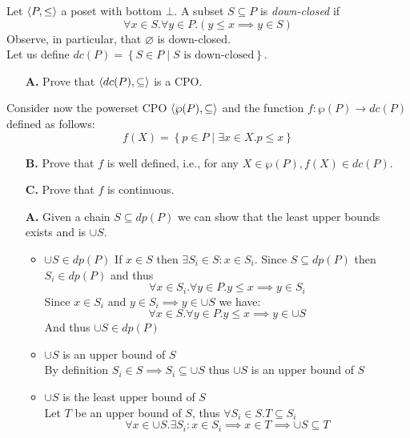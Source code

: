 \begin{exercise}{
    Let $\left< P, \leq \right>$ a poset with bottom $\bot$. A subset $S \subseteq P$ is \textit{down-closed} if
    \[ \forall x \in S. \forall y \in P. (y \leq x \implies y \in S) \]
    Observe, in particular, that $\varnothing$ is down-closed. \\
    Let us define $dc(P) = \left\{S \in P \mid S \text{ is down-closed}\right\}$.
    \begin{enumerate}
        \item[\textbf{A.}] Prove that $\left< dc(P), \subseteq \right>$ is a CPO.
    \end{enumerate}
    Consider now the powerset CPO $\left< \wp(P), \subseteq \right>$ and the function $f : \wp(P) \to dc(P)$ defined as follows:
    \[ f(X) = \left\{ p \in P \mid \exists x \in X . p \leq x \right\} \]
    \begin{enumerate}
        \item[\textbf{B.}] Prove that $f$ is well defined, i.e., for any $X \in \wp(P), f(X) \in dc(P)$.
        \item[\textbf{C.}] Prove that $f$ is continuous.
    \end{enumerate}
}
    \begin{enumerate}
        \item[\textbf{A.}]
            Given a chain $S \subseteq dp(P)$ we can show that the least upper bounds exists and is $\cup S$.
            \begin{itemize}
                \item $\cup S \in dp(P)$
                    If $x \in S$ then $\exists S_i \in S : x \in S_i$. Since $S \subseteq dp(P)$ then $S_i \in dp(P)$ and thus
                    \[ \forall x \in S_i. \forall y \in P. y \leq x \implies y \in S_i \]
                    Since $x \in S_i$ and $y \in S_i \implies y \in \cup S$ we have:
                    \[ \forall x \in S. \forall y \in P. y \leq x \implies y \in \cup S \]
                    And thus $\cup S \in dp(P)$
                \item $\cup S$ is an upper bound of $S$ \\
                    By definition $S_i \in S \implies S_i \subseteq \cup S$ thus $\cup S$ is an upper bound of $S$
                \item $\cup S$ is the least upper bound of $S$ \\
                    Let $T$ be an upper bound of $S$, thus $\forall S_i \in S. T \subseteq S_i$
                    \[ \forall x \in \cup S. \exists S_i : x \in S_i \implies x \in T \implies \cup S \subseteq T \]

\end{itemize}
\end{enumerate}
\end{exercise}
